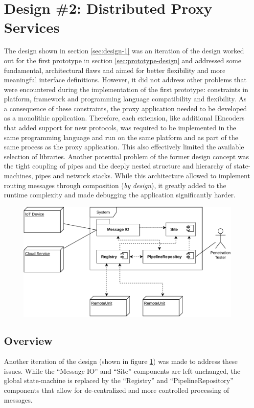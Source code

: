 \section{Design \#2: Distributed Proxy Services}
\label{sec:design-2}
The design shown in section \ref{sec:design-1} was an iteration of the design worked out for the first prototype in section \ref{sec:prototype-design} and addressed some fundamental, architectural flaws and aimed for better flexibility and more meaningful interface definitions. However, it did not address other problems that were encountered during the implementation of the first prototype: constraints in platform, framework and programming language compatibility and flexibility. As a consequence of these constraints, the proxy application needed to be developed as a monolithic application. Therefore, each extension, like additional IEncoders that added support for new protocols, was required to be implemented in the same programming language and run on the same platform and as part of the same process as the proxy application. This also effectively limited the available selection of libraries. Another potential problem of the former design concept was the tight coupling of pipes and the deeply nested structure and hierarchy of state-machines, pipes and network stacks. While this architecture allowed to implement routing messages through composition (\emph{by design}), it greatly added to the runtime complexity and made debugging the application significantly harder.
\begin{figure}[h]
    \centering
    \includegraphics[width=14cm]{img/ch05/component-view2-1.pdf}
    \label{fig:component-view2-1}
\end{figure}
\subsection{Overview}
Another iteration of the design (shown in figure \ref{fig:component-view2-1}) was made to address these issues. While the \enquote{Message IO} and \enquote{Site} components are left unchanged, the global state-machine is replaced by the \enquote{Registry} and \enquote{PipelineRepository} components that allow for de-centralized and more controlled processing of messages.

